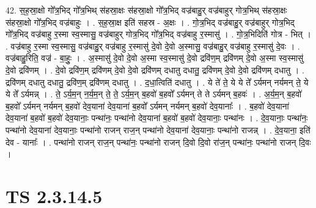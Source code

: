 \documentclass[17pt]{extarticle}
\begin{document}
42. स॒ह॒स्रा॒क्षो गो᳚त्र॒भिद् गो᳚त्र॒भिथ् स॑हस्रा॒क्षः स॑हस्रा॒क्षो गो᳚त्र॒भिद् वज्र॑बाहु॒र् वज्र॑बाहुर् गोत्र॒भिथ् स॑हस्रा॒क्षः स॑हस्रा॒क्षो गो᳚त्र॒भिद् वज्र॑बाहुः । . स॒ह॒स्रा॒क्ष इति॑ सहस्र - अ॒क्षः । . गो॒त्र॒भिद् वज्र॑बाहु॒र् वज्र॑बाहुर् गोत्र॒भिद् गो᳚त्र॒भिद् वज्र॑बाहु र॒स्मा स्व॒स्मासु॒ वज्र॑बाहुर् गोत्र॒भिद् गो᳚त्र॒भिद् वज्र॑बाहु र॒स्मासु॑ । . गो॒त्र॒भिदिति॑ गोत्र - भित् । . वज्र॑बाहु र॒स्मा स्व॒स्मासु॒ वज्र॑बाहु॒र् वज्र॑बाहु र॒स्मासु॑ दे॒वो दे॒वो अ॒स्मासु॒ वज्र॑बाहु॒र् वज्र॑बाहु र॒स्मासु॑ दे॒वः । . वज्र॑बाहु॒रिति॒ वज्र॑ - बा॒हुः॒ । . अ॒स्मासु॑ दे॒वो दे॒वो अ॒स्मा स्व॒स्मासु॑ दे॒वो द्रवि॑ण॒म् द्रवि॑णम् दे॒वो अ॒स्मा स्व॒स्मासु॑ दे॒वो द्रवि॑णम् । . दे॒वो द्रवि॑ण॒म् द्रवि॑णम् दे॒वो दे॒वो द्रवि॑णम् दधातु दधातु॒ द्रवि॑णम् दे॒वो दे॒वो द्रवि॑णम् दधातु । . द्रवि॑णम् दधातु दधातु॒ द्रवि॑ण॒म् द्रवि॑णम् दधातु । . द॒धा॒त्विति॑ दधातु । . ये ते॑ ते॒ ये ये ते᳚ ऽर्यमन् नर्यमन् ते॒ ये ये ते᳚ ऽर्यमन्न् । . ते॒ ऽर्य॒म॒न् न॒र्य॒म॒न् ते॒ ते॒ ऽर्य॒म॒न् ब॒हवो॑ ब॒हवो᳚ ऽर्यमन् ते ते ऽर्यमन् ब॒हवः॑ । . अ॒र्य॒म॒न् ब॒हवो॑ ब॒हवो᳚ ऽर्यमन् नर्यमन् ब॒हवो॑ देव॒याना॑ देव॒याना॑ ब॒हवो᳚ ऽर्यमन् नर्यमन् ब॒हवो॑ देव॒यानाः᳚ । . ब॒हवो॑ देव॒याना॑ देव॒याना॑ ब॒हवो॑ ब॒हवो॑ देव॒यानाः॒ पन्था॑नः॒ पन्था॑नो देव॒याना॑ ब॒हवो॑ ब॒हवो॑ देव॒यानाः॒ पन्था॑नः । . दे॒व॒यानाः॒ पन्था॑नः॒ पन्था॑नो देव॒याना॑ देव॒यानाः॒ पन्था॑नो राजन् राज॒न् पन्था॑नो देव॒याना॑ देव॒यानाः॒ पन्था॑नो राजन्न् । . दे॒व॒याना॒ इति॑ देव - यानाः᳚ । . पन्था॑नो राजन् राज॒न् पन्था॑नः॒ पन्था॑नो राजन् दि॒वो दि॒वो रा॑ज॒न् पन्था॑नः॒ पन्था॑नो राजन् दि॒वः । \newline
\pagebreak
{}
\section*{ TS 2.3.14.5 }
\end{document}
